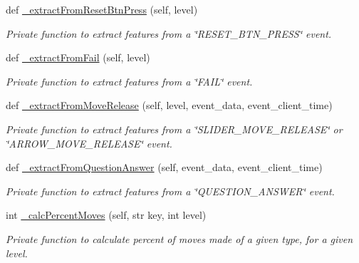 \begin{DoxyCompactItemize}
def \mbox{\hyperlink{classfeature__extractors_1_1_wave_extractor_1_1_wave_extractor_ab3f505d7f124a74ee6ff32a5ee3177c2}{\+\_\+extract\+From\+Reset\+Btn\+Press}} (self, level)
\begin{DoxyCompactList}\small\item\em Private function to extract features from a \char`\"{}\+R\+E\+S\+E\+T\+\_\+\+B\+T\+N\+\_\+\+P\+R\+E\+S\+S\char`\"{} event. \end{DoxyCompactList}\item 
def \mbox{\hyperlink{classfeature__extractors_1_1_wave_extractor_1_1_wave_extractor_ab2d36bf072eb9307502f183a20b36697}{\+\_\+extract\+From\+Fail}} (self, level)
\begin{DoxyCompactList}\small\item\em Private function to extract features from a \char`\"{}\+F\+A\+I\+L\char`\"{} event. \end{DoxyCompactList}\item 
def \mbox{\hyperlink{classfeature__extractors_1_1_wave_extractor_1_1_wave_extractor_a1ff2ae4c3729b9e217a238ddbd614f75}{\+\_\+extract\+From\+Move\+Release}} (self, level, event\+\_\+data, event\+\_\+client\+\_\+time)
\begin{DoxyCompactList}\small\item\em Private function to extract features from a \char`\"{}\+S\+L\+I\+D\+E\+R\+\_\+\+M\+O\+V\+E\+\_\+\+R\+E\+L\+E\+A\+S\+E\char`\"{} or \char`\"{}\+A\+R\+R\+O\+W\+\_\+\+M\+O\+V\+E\+\_\+\+R\+E\+L\+E\+A\+S\+E\char`\"{} event. \end{DoxyCompactList}\item 
def \mbox{\hyperlink{classfeature__extractors_1_1_wave_extractor_1_1_wave_extractor_ae9b6fbab1f81dfda11d3aca51cefdd2c}{\+\_\+extract\+From\+Question\+Answer}} (self, event\+\_\+data, event\+\_\+client\+\_\+time)
\begin{DoxyCompactList}\small\item\em Private function to extract features from a \char`\"{}\+Q\+U\+E\+S\+T\+I\+O\+N\+\_\+\+A\+N\+S\+W\+E\+R\char`\"{} event. \end{DoxyCompactList}\item 
int \mbox{\hyperlink{classfeature__extractors_1_1_wave_extractor_1_1_wave_extractor_a4cfb4cc348b8bcb8882137482f684d8c}{\+\_\+calc\+Percent\+Moves}} (self, str key, int level)
\begin{DoxyCompactList}\small\item\em Private function to calculate percent of moves made of a given type, for a given level. \end{DoxyCompactList}\item 

\end{DoxyCompactItemize}
